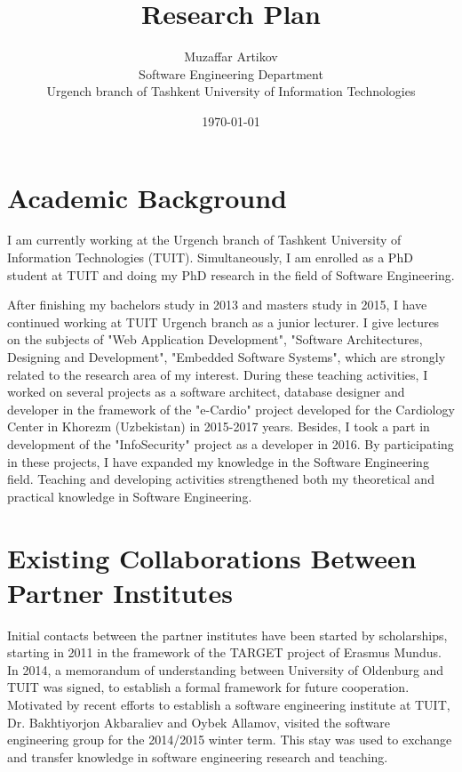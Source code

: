 \documentclass[10pt, oneside]{article}
\title{Research Plan}
\author{Muzaffar Artikov\\
Software Engineering Department\\
Urgench branch of Tashkent University of Information Technologies}
\date{\today}
\begin{document}
\maketitle

\section{Academic Background}
I am currently working at the Urgench branch of Tashkent University of Information Technologies (TUIT). Simultaneously, I am enrolled as a PhD student at TUIT and doing my PhD research in the field of Software Engineering. 

After finishing my bachelors study in 2013 and masters study in 2015, I have continued working at TUIT Urgench branch as a junior lecturer. I give lectures on the subjects of "Web Application Development", "Software Architectures, Designing and Development", "Embedded Software Systems", which are strongly related to the research area of my interest. During these teaching activities, I worked on several projects as a software architect, database designer and developer in the framework of the "e-Cardio" project developed for the Cardiology Center in Khorezm (Uzbekistan) in 2015-2017 years. Besides, I took a part in development of the "InfoSecurity" project as a developer in 2016. By participating in these projects, I have expanded my knowledge in the Software Engineering field. Teaching and developing activities strengthened both my theoretical and practical knowledge in Software Engineering.

\section{Existing Collaborations Between Partner Institutes}
Initial contacts between the partner institutes have been started by scholarships, starting in 2011 in the framework of the TARGET project of Erasmus Mundus. In 2014, a memorandum of understanding between University of Oldenburg and TUIT was signed, to establish a formal framework for future cooperation. Motivated by recent efforts to establish a software engineering institute at TUIT, Dr. Bakhtiyorjon Akbaraliev and Oybek Allamov, visited the software engineering group for the 2014/2015 winter term. This stay was used to exchange and transfer knowledge in software engineering research and teaching.
\end{document}
